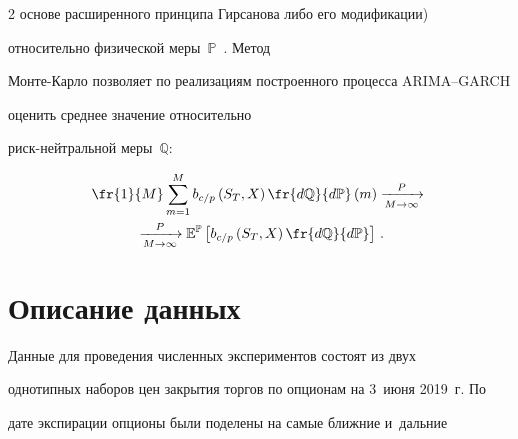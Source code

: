 \begin{multicols}{2}
основе расширенного принципа Гирсанова либо его модификации) 


относительно физической меры~$\mathbb{P}$~\cite{11-dan, 12-dan}. Метод 


Мон\-те-Кар\-ло позволяет по реализациям построенного процесса ARIMA--GARCH 


оценить среднее значение относительно  


риск-ней\-т\-раль\-ной меры~$\mathbb{Q}$:


\vspace*{-6pt}





\noindent


\begin{multline}


\fr{1}{M}\sum\limits_{m=1}^M b_{c/p}\left( S_T, X\right) 


\fr{d\mathbb{Q}}{d\mathbb{P}}\,(m) 


\xrightarrow[M\to\infty]{P}{} \\


{}\xrightarrow[M\to\infty]{P}


\mathbb{E}^{\mathbb{P}} \left[ b_{c/p}\left( 


S_T,X\right)\fr{d\mathbb{Q}}{d\mathbb{P}}\right]\,.


\label{e7-dan}


\end{multline}





\vspace*{-9pt}





\section{Описание данных}





\vspace*{-3pt}





  Данные для проведения численных экспериментов состоят из двух 


однотипных наборов цен закрытия торгов по опционам на 3~июня 2019~г. По 


дате экспирации опционы были поделены на самые ближние и~дальние 



\end{multicols}
